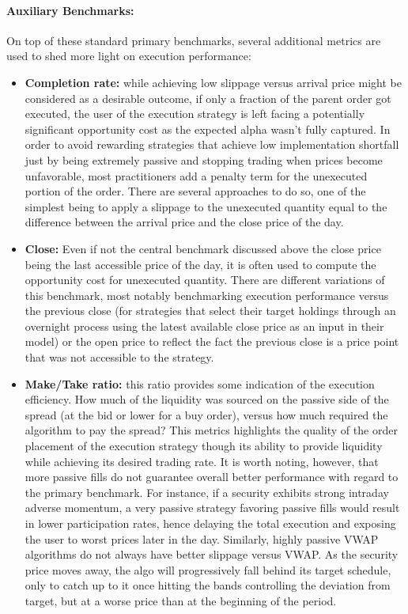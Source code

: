 
\paragraph{Auxiliary Benchmarks:}

On top of these standard primary benchmarks, several additional metrics are used to shed more light on execution performance:
\begin{itemize}
\item \textbf{Completion rate:} while achieving low slippage versus arrival price might be considered as a desirable outcome, if only a fraction of the parent order got executed, the user of the execution strategy is left facing a potentially significant opportunity cost as the expected alpha wasn't fully captured. In order to avoid rewarding strategies that achieve low implementation shortfall just by being extremely passive and stopping trading when prices become unfavorable, most practitioners add a penalty term for the unexecuted portion of the order. There are several approaches to do so, one of the simplest being to apply a slippage to the unexecuted quantity equal to the difference between the arrival price and the close price of the day. 
\item \textbf{Close:} Even if not the central benchmark discussed above the close price being the last accessible price of the day, it is often used to compute the opportunity cost for unexecuted quantity. 
There are different variations of this benchmark, most notably benchmarking execution performance versus the previous close (for strategies that select their target holdings through an overnight process using the latest available close price as an input in their model) or the open price to reflect the fact the previous close is a price point that was not accessible to the strategy.
\item \textbf{Make/Take ratio:} this ratio provides some indication of the execution efficiency. How much of the liquidity was sourced on the passive side of the spread (at the bid or lower for a buy order), versus how much required the algorithm to pay the spread? This metrics highlights the quality of the order placement of the execution strategy though its ability to provide liquidity while achieving its desired trading rate. It is worth noting, however, that more passive fills do not guarantee overall better performance with regard to the primary benchmark. For instance, if a security exhibits strong intraday adverse momentum, a very passive strategy favoring passive fills would result in lower participation rates, hence delaying the total execution and exposing the user to worst prices later in the day. Similarly, highly passive VWAP algorithms do not always have better slippage versus VWAP. As the security price moves away, the algo will progressively fall behind its target schedule, only to catch up to it once hitting the bands controlling the deviation from target, but at a worse price than at the beginning of the period.

\end{itemize}
